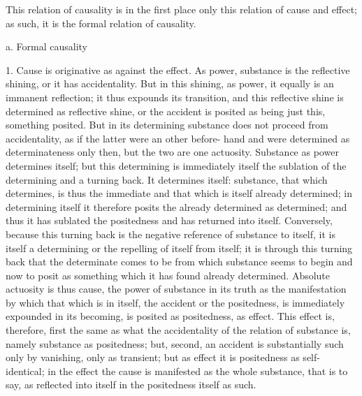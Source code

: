 This relation of causality is in the first place
only this relation of cause and effect;
as such, it is the formal relation of causality.

a. Formal causality

1. Cause is originative as against the effect.
As power, substance is the reflective shining,
or it has accidentality.
But in this shining, as power,
it equally is an immanent reflection;
it thus expounds its transition,
and this reflective shine is determined as reflective shine,
or the accident is posited
as being just this, something posited.
But in its determining substance
does not proceed from accidentality,
as if the latter were an other before-
hand and were determined as determinateness only then,
but the two are one actuosity.
Substance as power determines itself;
but this determining is immediately itself
the sublation of the determining and a turning back.
It determines itself: substance, that which determines, is
thus the immediate and that which is itself already determined;
in determining itself it therefore posits
the already determined as determined;
and thus it has sublated the
positedness and has returned into itself.
Conversely, because this turning back is
the negative reference of substance to itself,
it is itself a determining
or the repelling of itself from itself;
it is through this turning back that
the determinate comes to be from which
substance seems to begin
and now to posit as something
which it has found already determined.
Absolute actuosity is thus cause,
the power of substance in its truth
as the manifestation by which
that which is in itself,
the accident or the positedness,
is immediately expounded in its becoming,
is posited as positedness, as effect.
This effect is, therefore, first the same as
what the accidentality of the relation
of substance is, namely substance as positedness;
but, second, an accident
is substantially such only by vanishing, only as transient;
but as effect it is positedness as self-identical;
in the effect the cause is manifested as the whole substance,
that is to say, as reflected into itself
in the positedness itself as such.

